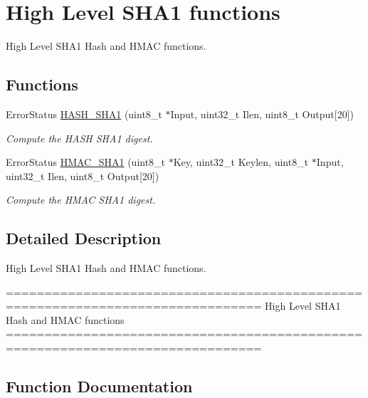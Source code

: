\hypertarget{group___h_a_s_h___group6}{}\section{High Level S\+H\+A1 functions}
\label{group___h_a_s_h___group6}


High Level S\+H\+A1 Hash and H\+M\+A\+C functions.  


\subsection*{Functions}
\begin{DoxyCompactItemize}
\item 
Error\+Status \hyperlink{group___h_a_s_h___group6_ga2728c02c36de6d800e1ede56ea7789cb}{H\+A\+S\+H\+\_\+\+S\+H\+A1} (uint8\+\_\+t $\ast$Input, uint32\+\_\+t Ilen, uint8\+\_\+t Output\mbox{[}20\mbox{]})
\begin{DoxyCompactList}\small\item\em Compute the H\+A\+S\+H S\+H\+A1 digest. \end{DoxyCompactList}\item 
Error\+Status \hyperlink{group___h_a_s_h___group6_ga2e38e900ca7838c1cea17cef19953a5e}{H\+M\+A\+C\+\_\+\+S\+H\+A1} (uint8\+\_\+t $\ast$Key, uint32\+\_\+t Keylen, uint8\+\_\+t $\ast$Input, uint32\+\_\+t Ilen, uint8\+\_\+t Output\mbox{[}20\mbox{]})
\begin{DoxyCompactList}\small\item\em Compute the H\+M\+A\+C S\+H\+A1 digest. \end{DoxyCompactList}\end{DoxyCompactItemize}


\subsection{Detailed Description}
High Level S\+H\+A1 Hash and H\+M\+A\+C functions. 

\begin{DoxyVerb} ===============================================================================
                          High Level SHA1 Hash and HMAC functions
 ===============================================================================\end{DoxyVerb}
 

\subsection{Function Documentation}
\hypertarget{group___h_a_s_h___group6_ga2728c02c36de6d800e1ede56ea7789cb}{}
